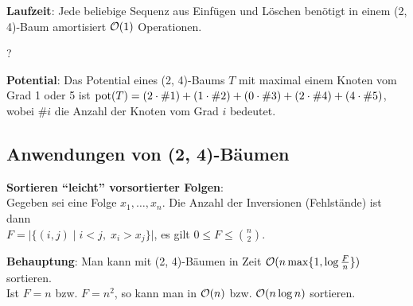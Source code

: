 \textbf{Laufzeit}:
Jede beliebige Sequenz aus Einfügen und Löschen benötigt in einem
(2, 4)-Baum amortisiert $\mathcal{O}(1)$ Operationen.

\begin{Beweis}
    ?
\end{Beweis}

\textbf{Potential}:
Das Potential eines (2, 4)-Baums $T$ mit maximal einem Knoten vom Grad 1 oder 5
ist $\operatorname{pot}(T) = (2 \cdot \#1) + (1 \cdot \#2) + (0 \cdot \#3) + (2 \cdot \#4) +
(4 \cdot \#5)$, wobei
$\#i$ die Anzahl der Knoten vom Grad $i$ bedeutet.

\pagebreak

\subsection{%
    Anwendungen von (2, 4)-Bäumen%
}

\textbf{Sortieren "`leicht"' vorsortierter Folgen}: \\
Gegeben sei eine Folge $x_1, \dotsc, x_n$.
Die Anzahl der Inversionen (Fehlstände) ist dann \\
$F = \Big|\big\{(i, j) \;|\; i < j,\; x_i > x_j\big\}\Big|$,
es gilt $0 \le F \le \binom{n}{2}$.

\textbf{Behauptung}: Man kann mit (2, 4)-Bäumen in
Zeit $\mathcal{O}(n \max\{1, \log \frac{F}{n}\})$ sortieren. \\
Ist $F = n$ bzw. $F = n^2$, so kann man in $\mathcal{O}(n)$ bzw. $\mathcal{O}(n \log n)$
sortieren.

